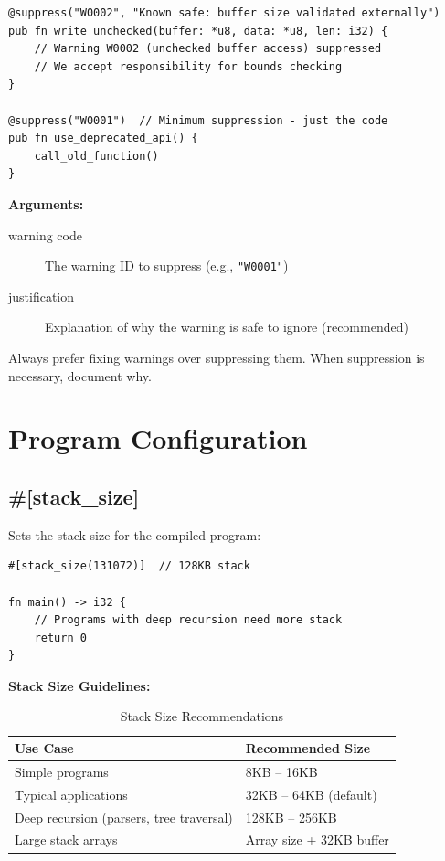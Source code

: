 \begin{lstlisting}
@suppress("W0002", "Known safe: buffer size validated externally")
pub fn write_unchecked(buffer: *u8, data: *u8, len: i32) {
    // Warning W0002 (unchecked buffer access) suppressed
    // We accept responsibility for bounds checking
}

@suppress("W0001")  // Minimum suppression - just the code
pub fn use_deprecated_api() {
    call_old_function()
}
\end{lstlisting}

\textbf{Arguments:}
\begin{description}
    \item[warning code] The warning ID to suppress (e.g., \texttt{"W0001"})
    \item[justification] Explanation of why the warning is safe to ignore (recommended)
\end{description}

Always prefer fixing warnings over suppressing them. When suppression is necessary, document why.

\section{Program Configuration}
\label{sec:program-attributes}

\subsection{\#[stack\_size]}

Sets the stack size for the compiled program:

\begin{lstlisting}
#[stack_size(131072)]  // 128KB stack

fn main() -> i32 {
    // Programs with deep recursion need more stack
    return 0
}
\end{lstlisting}

\textbf{Stack Size Guidelines:}

\begin{table}[h]
\centering
\begin{tabular}{ll}
\hline
\textbf{Use Case} & \textbf{Recommended Size} \\
\hline
Simple programs & 8KB -- 16KB \\
Typical applications & 32KB -- 64KB (default) \\
Deep recursion (parsers, tree traversal) & 128KB -- 256KB \\
Large stack arrays & Array size + 32KB buffer \\
\hline
\end{tabular}
\caption{Stack Size Recommendations}
\end{table}

